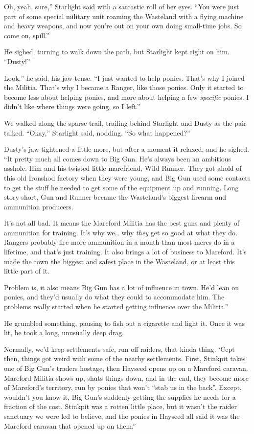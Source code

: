 \leavevmode{}Oh, yeah, sure,” Starlight said with a sarcastic roll of her eyes. “You were just part of some special military unit roaming the Wasteland with a flying machine and heavy weapons, and now you’re out on your own doing small-time jobs. So come on, spill.”

He sighed, turning to walk down the path, but Starlight kept right on him. “Dusty!”

\leavevmode{}Look,” he said, his jaw tense. “I just wanted to help ponies. That’s why I joined the Militia. That’s why I became a Ranger, like those ponies. Only it started to become less about helping ponies, and more about helping a few \textit{specific} ponies. I didn’t like where things were going, so I left.”

We walked along the sparse trail, trailing behind Starlight and Dusty as the pair talked. “Okay,” Starlight said, nodding. “So what happened?”

Dusty’s jaw tightened a little more, but after a moment it relaxed, and he sighed. “It pretty much all comes down to Big Gun. He’s always been an ambitious asshole. Him and his twisted little marefriend, Wild Runner. They got ahold of this old Ironshod factory when they were young, and Big Gun used some contacts to get the stuff he needed to get some of the equipment up and running. Long story short, Gun and Runner became the Wasteland’s biggest firearm and ammunition producers.

\leavevmode{}It’s not all bad. It means the Mareford Militia has the best guns and plenty of ammunition for training. It’s why we… why \textit{they} get so good at what they do. Rangers probably fire more ammunition in a month than most mercs do in a lifetime, and that’s just training. It also brings a lot of business to Mareford. It’s made the town the biggest and safest place in the Wasteland, or at least this little part of it.

\leavevmode{}Problem is, it also means Big Gun has a lot of influence in town. He’d lean on ponies, and they’d usually do what they could to accommodate him. The problems really started when he started getting influence over the Militia.”

He grumbled something, pausing to fish out a cigarette and light it. Once it was lit, he took a long, unusually deep drag.

\leavevmode{}Normally, we’d keep settlements safe, run off raiders, that kinda thing. ‘Cept then, things got weird with some of the nearby settlements. First, Stinkpit takes one of Big Gun’s traders hostage, then Hayseed opens up on a Mareford caravan. Mareford Militia shows up, shuts things down, and in the end, they become more of Mareford’s territory, run by ponies that won’t “stab us in the back”. Except, wouldn’t you know it, Big Gun’s suddenly getting the supplies he needs for a fraction of the cost. Stinkpit was a rotten little place, but it wasn’t the raider sanctuary we were led to believe, and the ponies in Hayseed all said it was the Mareford caravan that opened up on them.”

